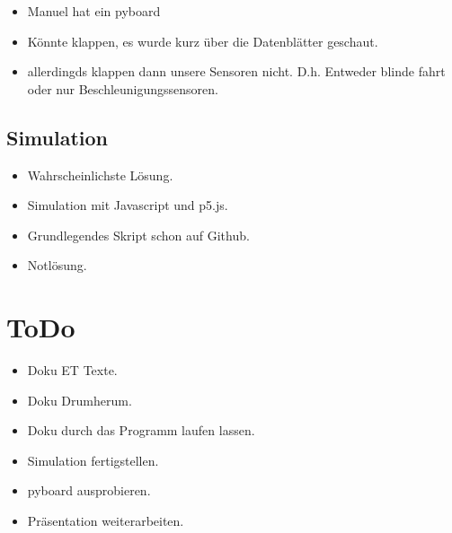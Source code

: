 \documentclass{article}
\begin{document}
\begin{itemize}

\item Manuel hat ein pyboard

\item Könnte klappen, es wurde kurz über die Datenblätter geschaut.

\item allerdingds klappen dann unsere Sensoren nicht. D.h. Entweder blinde fahrt oder nur Beschleunigungssensoren.

\end{itemize}

\subsection{Simulation}

\begin{itemize}

\item Wahrscheinlichste Lösung.

\item Simulation mit Javascript und p5.js.

\item Grundlegendes Skript schon auf Github.

\item Notlösung.

\end{itemize}

\section{ToDo}

\begin{itemize}

\item Doku ET Texte.

\item Doku Drumherum.

\item Doku durch das Programm laufen lassen.

\item Simulation fertigstellen.

\item pyboard ausprobieren.

\item Präsentation weiterarbeiten.

\end{itemize}
\end{document}
